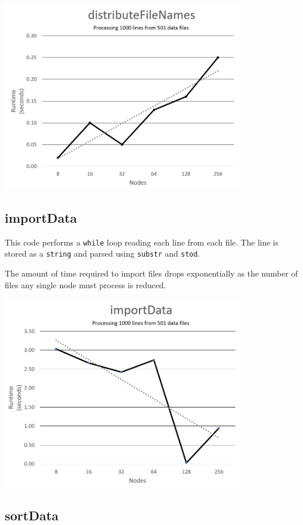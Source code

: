\includegraphics[width=0.8\textwidth]{distributeFileNames.png}

\subsection{importData}

This code performs a \texttt{while} loop reading each line from each file. The line is stored as a \texttt{string} and parsed using \texttt{substr} and \texttt{stod}.

The amount of time required to import files drops exponentially as the number of files any single node must process is reduced.

\includegraphics[width=0.8\textwidth]{importData.png}

\subsection{sortData}

